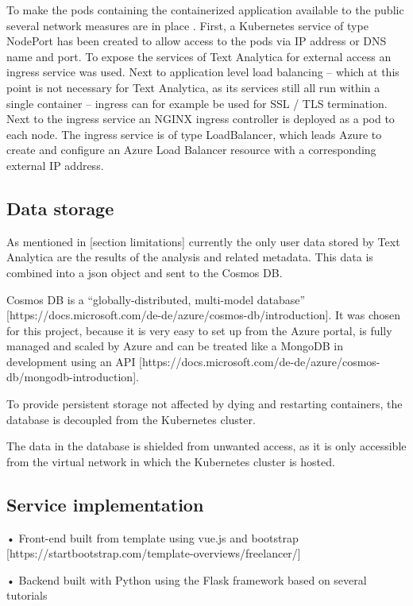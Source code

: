 \documentclass[conference]{IEEEtran}
\begin{document}
To make the pods containing the containerized application available to the public several network measures are in place \cite{AKSNetworks} \cite{AzureExposeKubernetesCluster}. First, a Kubernetes service of type NodePort has been created to allow access to the pods via IP address or DNS name and port. To expose the services of Text Analytica for external access an ingress service was used. Next to application level load balancing – which at this point is not necessary for Text Analytica, as its services still all run within a single container – ingress can for example be used for SSL / TLS termination. Next to the ingress service an NGINX ingress controller is deployed as a pod to each node. The ingress service is of type LoadBalancer, which leads Azure to create and configure an Azure Load Balancer resource with a corresponding external IP address.

\subsection{Data storage}
As mentioned in [section limitations] currently the only user data stored by Text Analytica are the results of the analysis and related metadata. This data is combined into a json object and sent to the Cosmos DB.

Cosmos DB is a “globally-distributed, multi-model database” [https://docs.microsoft.com/de-de/azure/cosmos-db/introduction]. It was chosen for this project, because it is very easy to set up from the Azure portal, is fully managed and scaled by Azure and can be treated like a MongoDB in development using an API [https://docs.microsoft.com/de-de/azure/cosmos-db/mongodb-introduction].

To provide persistent storage not affected by dying and restarting containers, the database is decoupled from the Kubernetes cluster.

The data in the database is shielded from unwanted access, as it is only accessible from the virtual network in which the Kubernetes cluster is hosted.

\subsection{Service implementation}
•	Front-end built from template using vue.js and bootstrap [https://startbootstrap.com/template-overviews/freelancer/]

•	Backend built with Python using the Flask framework based on several tutorials
\end{document}
